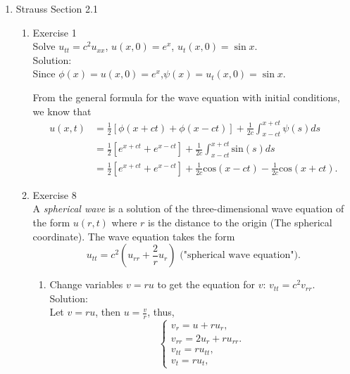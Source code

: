 \documentclass[12pt]{article}%
\begin{document}
\begin{enumerate}
    \pagebreak
    
    \item Strauss Section 2.1 \smallskip
    \begin{enumerate}
        \item Exercise 1 \smallskip \\
        Solve $u_{tt} = c^2u_{xx}$, $u\left(x,0\right) = e^x$, $u_t\left(x,0\right) = \sin{x}$. \smallskip \\
        Solution:\\
        Since $\phi(x)=u\left(x,0\right) = e^x$,$\psi(x)=u_t\left(x,0\right) = \sin{x}.$

        From the general formula for the wave equation with initial conditions,
        we know that
        \begin{align*}
            u(x,t)&=\frac{1}{2}[\phi(x+ct)+\phi(x-ct)]+\frac{1}{2c}\int_{x-ct}^{x+ct}\psi(s)ds\\
                  &=\frac{1}{2}[e^{x+ct}+e^{x-ct}]+\frac{1}{2c}\int_{x-ct}^{x+ct}\text{sin}(s)ds\\
                  &=\frac{1}{2}[e^{x+ct}+e^{x-ct}]+\frac{1}{2c}\text{cos}(x-ct)-\frac{1}{2c}\text{cos}(x+ct).
        \end{align*}
        \item Exercise 8 \smallskip \\
        A \emph{spherical wave} is a solution of the three-dimensional wave equation of the form $u\left(r,t\right)$ where $r$ is the distance to the origin (The spherical coordinate). The wave equation takes the form
        $$u_{tt} = c^2\left(u_{rr} + \frac{2}{r}u_r\right) \text{    ("spherical wave equation").}$$
        \begin{enumerate}
            \item Change variables $v= ru$ to get the equation for $v$:  $v_{tt} = c^2v_{rr}$. \smallskip \\
            Solution:\\
            Let $v=ru$, then $u=\frac{v}{r}$, thus, 
            \begin{equation}\label{v-equ}
                \begin{cases}
                    v_{r}=u+ru_{r},
                    \\
                    v_{rr}=2u_{r}+ru_{rr}.
                    \\
                    v_{tt}=ru_{tt},
                    \\
                    v_{t}=ru_{t},
                \end{cases}

\end{equation}
\end{enumerate}
\end{enumerate}
\end{enumerate}
\end{document}
